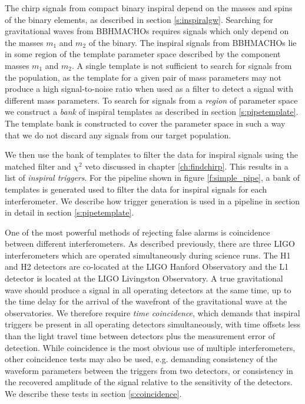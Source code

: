 The chirp signals from compact binary inspiral depend on the masses and spins
of the binary elements, as described in section \ref{s:inspiralgw}. Searching
for gravitational waves from BBHMACHOs requires signals which only depend on
the masses $m_1$ and $m_2$ of the binary.  The inspiral signals from BBHMACHOs
lie in some region of the template parameter space described by the component
masses $m_1$ and $m_2$. A single template is not sufficient to search for
signals from the population, as the template for a given pair of mass
parameters may not produce a high signal-to-noise ratio when used as a filter
to detect a signal with different mass parameters.  To search for signals from
a \emph{region} of parameter space we construct a \emph{bank} of inspiral
templates as described in section \ref{s:pipetemplate}. The template bank is
constructed to cover the parameter space in such a way that we do not discard
any signals from our target population.

We then use the bank of templates to filter the data for inspiral signals using
the matched filter and $\chi^2$ veto discussed in chapter \ref{ch:findchirp}.
This results in a list of \emph{inspiral triggers}. For the pipeline shown in
figure \ref{f:simple_pipe}, a bank of templates is generated used to filter
the data for inspiral signals for each interferometer. We describe how trigger
generation is used in a pipeline in section in detail in section
\ref{s:pipetemplate}.

One of the most powerful methods of rejecting false alarms is coincidence
between different interferometers. As described previously, there are three
LIGO interferometers which are operated simultaneously during science runs.
The H1 and H2 detectors are co-located at the LIGO Hanford Observatory and the
L1 detector is located at the LIGO Livingston Observatory. A true
gravitational wave should produce a signal in all operating detectors at the
same time, up to the time delay for the arrival of the wavefront of the
gravitational wave at the observatories.  We therefore require \emph{time
coincidence}, which demands that inspiral triggers be present in all operating
detectors simultaneously, with time offsets less than the light travel time
between detectors plus the measurement error of detection. While coincidence
is the most obvious use of multiple interferometers, other coincidence tests
may also be used, e.g. demanding consistency of the waveform parameters
between the triggers from two detectors, or consistency in the recovered
amplitude of the signal relative to the sensitivity of the detectors. We
describe these tests in section \ref{s:coincidence}.

